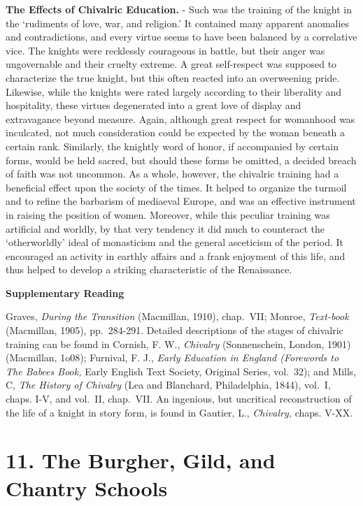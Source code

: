 \documentclass[
]{book}
\begin{document}
\textbf{The Effects of Chivalric Education.} - Such was the training of the knight in the `rudiments of love, war, and religion.' It contained many apparent anomalies and contradictions, and every virtue seems to have been balanced by a correlative vice. The knights were recklessly courageous in battle, but their anger was ungovernable and their cruelty extreme. A great self-respect was supposed to characterize the true knight, but this often reacted into an overweening pride. Likewise, while the knights were rated largely according to their liberality and hospitality, these virtues degenerated into a great love of display and extravagance beyond measure. Again, although great respect for womanhood was inculcated, not much consideration could be expected by the woman beneath a certain rank. Similarly, the knightly word of honor, if accompanied by certain forms, would be held sacred, but should these forms be omitted, a decided breach of faith was not uncommon. As a whole, however, the chivalric training had a beneficial effect upon the society of the times. It helped to organize the turmoil and to refine the barbarism of mediaeval Europe, and was an effective instrument in raising the position of women. Moreover, while this peculiar training was artificial and worldly, by that very tendency it did much to counteract the `otherworldly' ideal of monasticism and the general asceticism of the period. It encouraged an activity in earthly affairs and a frank enjoyment of this life, and thus helped to develop a striking characteristic of the Renaissance.

\textbf{Supplementary Reading}

Graves, \emph{During the Transition} (Macmillan, 1910), chap.~VII; Monroe, \emph{Text-book} (Macmillan, 1905), pp.~284-291. Detailed descriptions of the stages of chivalric training can be found in Cornish, F. W., \emph{Chivalry} (Sonnenschein, London, 1901) (Macmillan, 1o08); Furnival, F. J., \emph{Early Education in England (Forewords to The Babees Book,} Early English Text Society, Original Series, vol.~32); and Mills, C, \emph{The History of Chivalry} (Lea and Blanchard, Philadelphia, 1844), vol.~I, chaps. I-V, and vol.~II, chap.~VII. An ingenious, but uncritical reconstruction of the life of a knight in story form, is found in Gautier, L., \emph{Chivalry,} chaps. V-XX.

\hypertarget{the-burgher-gild-and-chantry-schools}{%
\chapter{11. The Burgher, Gild, and Chantry Schools}\label{the-burgher-gild-and-chantry-schools}}
\end{document}
